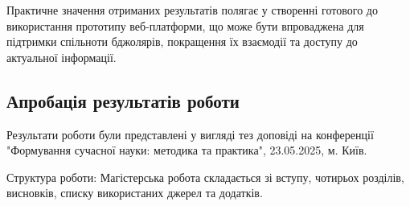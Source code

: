 Практичне значення отриманих результатів полягає у створенні готового до використання прототипу веб-платформи, що може бути впроваджена для підтримки спільноти бджолярів, покращення їх взаємодії та доступу до актуальної інформації.

\subsection*{Апробація результатів роботи}
Результати роботи були представлені у вигляді тез доповіді на конференції "Формування сучасної науки: методика та практика", 23.05.2025, м. Київ.

Структура роботи: Магістерська робота складається зі вступу, чотирьох розділів, висновків, списку використаних джерел та додатків. 